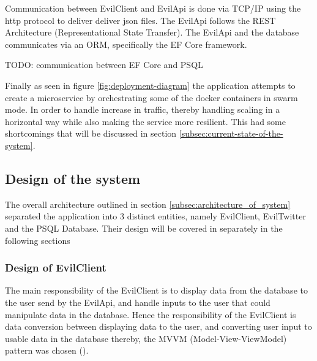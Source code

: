 \documentclass[report/main.tex]{subfiles}
\begin{document}
        Communication between EvilClient and EvilApi is done via TCP/IP using the http protocol to deliver deliver json files. The EvilApi follows the REST Architecture (Representational State Transfer). The EvilApi and the database communicates via an ORM, specifically the EF Core framework.
        
        TODO: communication between EF Core and PSQL
        
        Finally as seen in figure \ref{fig:deployment-diagram} the application attempts to create a microservice by orchestrating some of the docker containers in swarm mode. In order to handle increase in traffic, thereby handling scaling in a horizontal way while also making the service more resilient. This had some shortcomings that will be discussed in section \ref{subsec:current-state-of-the-system}.

    \subsection{Design of the system}
    \label{subsec:design_of_system}
        The overall architecture outlined in section \ref{subsec:architecture_of_system} separated the application into 3 distinct entities, namely EvilClient, EvilTwitter and the PSQL Database. Their design will be covered in separately in the following sections
        
        \subsubsection{Design of EvilClient}
        \label{subsubsec:architexture_of_evilclient}
            The main responsibility of the EvilClient is to display data from the database to the user send by the EvilApi, and handle inputs to the user that could manipulate data in the database. Hence the responsibility of the EvilClient is data conversion between displaying data to the user, and converting user input to usable data in the database thereby, the MVVM (Model-View-ViewModel) pattern was chosen (\cite{ms-mvvm}).
            
\end{document}
